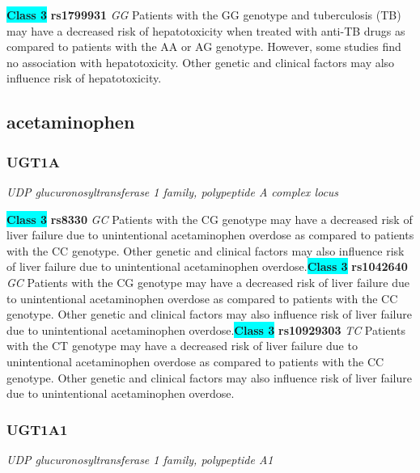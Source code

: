 \documentclass{report}
\begin{document}
\textbf{\colorbox{cyan} {Class 3}} \textbf{ rs1799931 } \textit{ GG }
Patients with the GG genotype and tuberculosis (TB) may have a decreased risk of hepatotoxicity when treated with anti-TB drugs as compared to patients with the AA or AG genotype. However, some studies find no association with hepatotoxicity. Other genetic and clinical factors may also influence risk of hepatotoxicity.\newline\subsection{ acetaminophen }\subsubsection{ UGT1A }
\textit{ UDP glucuronosyltransferase 1 family, polypeptide A complex locus }

\textbf{\colorbox{cyan} {Class 3}} \textbf{ rs8330 } \textit{ GC }
Patients with the CG genotype may have a decreased risk of liver failure due to unintentional acetaminophen overdose as compared to patients with the CC genotype. Other genetic and clinical factors may also influence risk of liver failure due to unintentional acetaminophen overdose.\newline\textbf{\colorbox{cyan} {Class 3}} \textbf{ rs1042640 } \textit{ GC }
Patients with the CG genotype may have a decreased risk of liver failure due to unintentional acetaminophen overdose as compared to patients with the CC genotype. Other genetic and clinical factors may also influence risk of liver failure due to unintentional acetaminophen overdose.\newline\textbf{\colorbox{cyan} {Class 3}} \textbf{ rs10929303 } \textit{ TC }
Patients with the CT genotype may have a decreased risk of liver failure due to unintentional acetaminophen overdose as compared to patients with the CC genotype. Other genetic and clinical factors may also influence risk of liver failure due to unintentional acetaminophen overdose.\newline\subsubsection{ UGT1A1 }
\textit{ UDP glucuronosyltransferase 1 family, polypeptide A1 }
\end{document}
